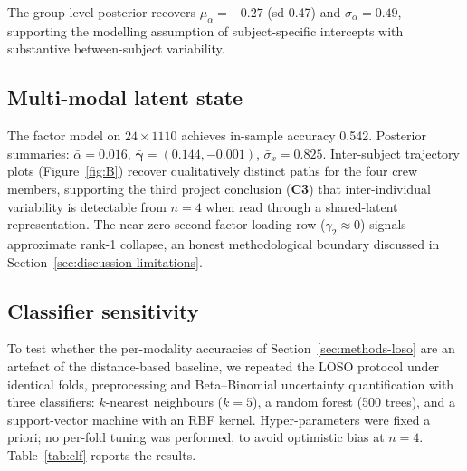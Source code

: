 \documentclass[11pt,a4paper,3p,authoryear]{elsarticle}
\begin{document}
The group-level posterior recovers $\mu_\alpha = -0.27$ (sd 0.47) and $\sigma_\alpha = 0.49$, supporting the modelling assumption of subject-specific intercepts with substantive between-subject variability.

\subsection{Multi-modal latent state}

The factor model on $24 \times 1110$ achieves in-sample accuracy 0.542. Posterior summaries: $\bar\alpha = 0.016$, $\bar{\boldsymbol{\gamma}} = (0.144, -0.001)$, $\bar\sigma_x = 0.825$. Inter-subject trajectory plots (Figure~\ref{fig:B}) recover qualitatively distinct paths for the four crew members, supporting the third project conclusion (\textbf{C3}) that inter-individual variability is detectable from $n=4$ when read through a shared-latent representation. The near-zero second factor-loading row (\(\gamma_2 \approx 0\)) signals approximate rank-1 collapse, an honest methodological boundary discussed in Section~\ref{sec:discussion-limitations}.

\subsection{Classifier sensitivity}\label{sec:results-classifier}

To test whether the per-modality accuracies of Section~\ref{sec:methods-loso} are an artefact of the distance-based baseline, we repeated the LOSO protocol under identical folds, preprocessing and Beta--Binomial uncertainty quantification with three classifiers: $k$-nearest neighbours ($k=5$), a random forest (500 trees), and a support-vector machine with an RBF kernel. Hyper-parameters were fixed a priori; no per-fold tuning was performed, to avoid optimistic bias at $n=4$. Table~\ref{tab:clf} reports the results.
\end{document}
